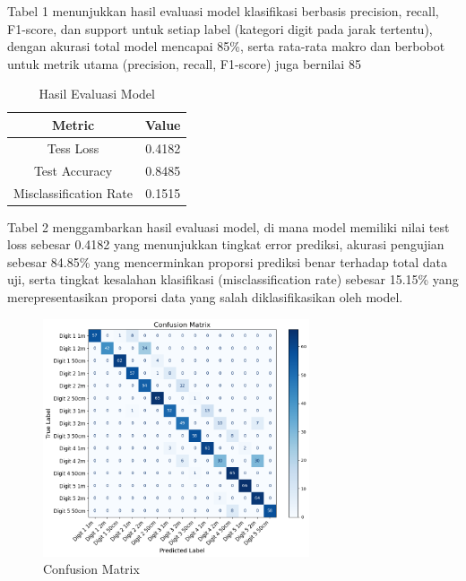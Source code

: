 \documentclass[12pt,a4paper]{article}
\begin{document}
\begin{itemize}
\hspace{0.5cm} Tabel 1 menunjukkan hasil evaluasi model klasifikasi berbasis precision, recall, F1-score, dan support untuk setiap label (kategori digit pada jarak tertentu), dengan akurasi total model mencapai 85\%, serta rata-rata makro dan berbobot untuk metrik utama (precision, recall, F1-score) juga bernilai 85%


\begin{table}[h]
    \centering
    \begin{tabular}{|c|c|}
    \hline
    \textbf{Metric} & \textbf{Value} \\ \hline
    Tess Loss & 0.4182 \\ \hline
    Test Accuracy & 0.8485 \\ \hline
    Misclassification Rate & 0.1515 \\ \hline
    \end{tabular}
    \caption{Hasil Evaluasi Model}
    \label{tab:model_results}
\end{table}

\hspace{0.5cm} Tabel 2 menggambarkan hasil evaluasi model, di mana model memiliki nilai test loss sebesar 0.4182 yang menunjukkan tingkat error prediksi, akurasi pengujian sebesar 84.85\% yang mencerminkan proporsi prediksi benar terhadap total data uji, serta tingkat kesalahan klasifikasi (misclassification rate) sebesar 15.15\% yang merepresentasikan proporsi data yang salah diklasifikasikan oleh model.

\newpage
\begin{figure}[h]
    \centering
    \includegraphics[width=0.7\textwidth]{Image/matrix.png}
    \caption{Confusion Matrix}
    \label{fig:confusion_matrix}
\end{figure}


\end{itemize}
\end{document}
